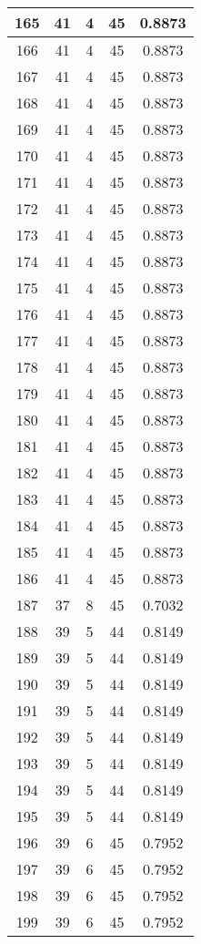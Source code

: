\documentclass[letterpaper, 12pt]{article}
\begin{document}
\begin{longtable}{|c|c|c|c|c|}
\hline
165 & 41 & 4 & 45 & 0.8873 \\
\hline
166 & 41 & 4 & 45 & 0.8873 \\
\hline
167 & 41 & 4 & 45 & 0.8873 \\
\hline
168 & 41 & 4 & 45 & 0.8873 \\
\hline
169 & 41 & 4 & 45 & 0.8873 \\
\hline
170 & 41 & 4 & 45 & 0.8873 \\
\hline
171 & 41 & 4 & 45 & 0.8873 \\
\hline
172 & 41 & 4 & 45 & 0.8873 \\
\hline
173 & 41 & 4 & 45 & 0.8873 \\
\hline
174 & 41 & 4 & 45 & 0.8873 \\
\hline
175 & 41 & 4 & 45 & 0.8873 \\
\hline
176 & 41 & 4 & 45 & 0.8873 \\
\hline
177 & 41 & 4 & 45 & 0.8873 \\
\hline
178 & 41 & 4 & 45 & 0.8873 \\
\hline
179 & 41 & 4 & 45 & 0.8873 \\
\hline
180 & 41 & 4 & 45 & 0.8873 \\
\hline
181 & 41 & 4 & 45 & 0.8873 \\
\hline
182 & 41 & 4 & 45 & 0.8873 \\
\hline
183 & 41 & 4 & 45 & 0.8873 \\
\hline
184 & 41 & 4 & 45 & 0.8873 \\
\hline
185 & 41 & 4 & 45 & 0.8873 \\
\hline
186 & 41 & 4 & 45 & 0.8873 \\
\hline
187 & 37 & 8 & 45 & 0.7032 \\
\hline
188 & 39 & 5 & 44 & 0.8149 \\
\hline
189 & 39 & 5 & 44 & 0.8149 \\
\hline
190 & 39 & 5 & 44 & 0.8149 \\
\hline
191 & 39 & 5 & 44 & 0.8149 \\
\hline
192 & 39 & 5 & 44 & 0.8149 \\
\hline
193 & 39 & 5 & 44 & 0.8149 \\
\hline
194 & 39 & 5 & 44 & 0.8149 \\
\hline
195 & 39 & 5 & 44 & 0.8149 \\
\hline
196 & 39 & 6 & 45 & 0.7952 \\
\hline
197 & 39 & 6 & 45 & 0.7952 \\
\hline
198 & 39 & 6 & 45 & 0.7952 \\
\hline
199 & 39 & 6 & 45 & 0.7952 \\
\hline
\end{longtable}
\end{document}
